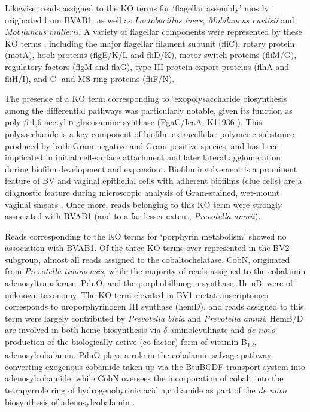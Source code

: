 \documentclass[sn-mathphys,Numbered]{sn-jnl}%
\begin{document}
Likewise, reads assigned to the KO terms for `flagellar assembly' mostly originated from BVAB1, as well as \textit{Lactobacillus iners}, \textit{Mobiluncus curtisii} and \textit{Mobiluncus mulieris}. A variety of flagellar components were represented by these KO terms \citep{armitage_assembly_2020}, including the major flagellar filament subunit (fliC), rotary protein (motA), hook proteins (flgE/K/L and fliD/K), motor switch proteins (fliM/G), regulatory factors (flgM and flaG), type III protein export proteins (flhA and fliH/I), and C- and MS-ring proteins (fliF/N). 

The presence of a KO term corresponding to `exopolysaccharide biosynthesis' among the differential pathways was particularly notable, given its function as poly-$\beta$-1,6-acetyl-\textsc{d}-glucosamine synthase (PgaC/IcaA; K11936 \citep{choi_pgaabcd_2009}). This polysaccharide is a key component of biofilm extracellular polymeric substance produced by both Gram-negative and Gram-positive species, and has been implicated in initial cell-surface attachment and later lateral agglomeration during biofilm development and expansion \citep{agladze_spatial_2005}. Biofilm involvement is a prominent feature of BV \citep{swidsinski_biofilm_2014} and vaginal epithelial cells with adherent biofilms (clue cells) are a diagnostic feature during microscopic analysis of Gram-stained, wet-mount vaginal smears \citep{simoes2006clinical}. Once more, reads belonging to this KO term were strongly associated with BVAB1 (and to a far lesser extent, \textit{Prevotella amnii}).

Reads corresponding to the KO terms for `porphyrin metabolism' showed no association with BVAB1. Of the three KO terms over-represented in the BV2 subgroup, almost all reads assigned to the cobaltochelatase, CobN, originated from \textit{Prevotella timonensis}, while the majority of reads assigned to the cobalamin adenosyltransferase, PduO, and the porphobillinogen synthase, HemB, were of unknown taxonomy. The KO term elevated in BV1 metatranscriptomes corresponds to uroporphyrinogen III synthase (hemD), and reads assigned to this term were largely contributed by \textit{Prevotella bivia} and \textit{Prevotella amnii}. HemB/D are involved in both heme biosynthesis via $\delta$-aminolevulinate and \textit{de novo} production of the biologically-active (co-factor) form of vitamin B\textsubscript{12}, adenosylcobalamin. PduO plays a role in the cobalamin salvage pathway, converting exogenous cobamide taken up via the BtuBCDF transport system into adenosylcobamide, while CobN oversees the incorporation of cobalt into the tetrapyrrole ring of hydrogenobyrinic acid a,c diamide as part of the \textit{de novo} biosynthesis of adenosylcobalamin \citep{fang_microbial_2017}.
\end{document}
